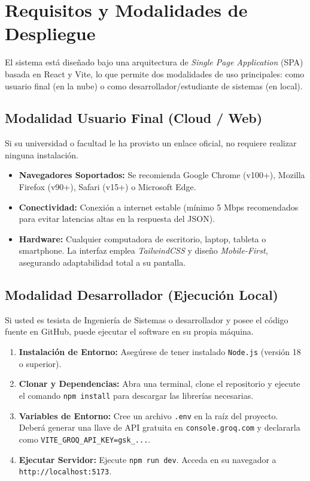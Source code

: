 \documentclass[12pt,a4paper]{article}
\begin{document}
\section{Requisitos y Modalidades de Despliegue}
El sistema está diseñado bajo una arquitectura de \textit{Single Page Application} (SPA) basada en React y Vite, lo que permite dos modalidades de uso principales: como usuario final (en la nube) o como desarrollador/estudiante de sistemas (en local).

\subsection{Modalidad Usuario Final (Cloud / Web)}
Si su universidad o facultad le ha provisto un enlace oficial, no requiere realizar ninguna instalación.
\begin{itemize}
    \item \textbf{Navegadores Soportados:} Se recomienda Google Chrome (v100+), Mozilla Firefox (v90+), Safari (v15+) o Microsoft Edge.
    \item \textbf{Conectividad:} Conexión a internet estable (mínimo 5 Mbps recomendados para evitar latencias altas en la respuesta del JSON).
    \item \textbf{Hardware:} Cualquier computadora de escritorio, laptop, tableta o smartphone. La interfaz emplea \textit{TailwindCSS} y diseño \textit{Mobile-First}, asegurando adaptabilidad total a su pantalla.
\end{itemize}

\subsection{Modalidad Desarrollador (Ejecución Local)}
Si usted es tesista de Ingeniería de Sistemas o desarrollador y posee el código fuente en GitHub, puede ejecutar el software en su propia máquina.
\begin{enumerate}
    \item \textbf{Instalación de Entorno:} Asegúrese de tener instalado \texttt{Node.js} (versión 18 o superior).
    \item \textbf{Clonar y Dependencias:} Abra una terminal, clone el repositorio y ejecute el comando \texttt{npm install} para descargar las librerías necesarias.
    \item \textbf{Variables de Entorno:} Cree un archivo \texttt{.env} en la raíz del proyecto. Deberá generar una llave de API gratuita en \texttt{console.groq.com} y declararla como \texttt{VITE\_GROQ\_API\_KEY=gsk\_...}.
    \item \textbf{Ejecutar Servidor:} Ejecute \texttt{npm run dev}. Acceda en su navegador a \texttt{http://localhost:5173}.
\end{enumerate}
\end{document}
